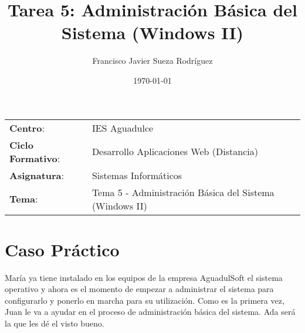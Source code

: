 


\title{
\vspace{10ex}
\normalfont \normalsize
\Huge \textbf{Tarea 5: Administración Básica del Sistema (Windows II)}
}
\author{Francisco Javier Sueza Rodríguez}
\date{\normalsize\today}



\maketitle

\thispagestyle{empty}

\vspace{68ex}

\begin{center}
    \begin{tabular}{l l}
        \textbf{Centro}: & IES Aguadulce \\
        \textbf{Ciclo Formativo}: & Desarrollo Aplicaciones Web (Distancia)\\
        \textbf{Asignatura}: & Sistemas Informáticos\\
        \textbf{Tema}: & Tema 5 -  Administración Básica del Sistema (Windows II)\\
    \end{tabular}
\end{center}

\newpage

\tableofcontents

\newpage

\listoffigures

\newpage

\section{Caso Práctico}

María ya tiene instalado en los equipos de la empresa AguadulSoft el sistema operativo y ahora es el momento de empezar a administrar el sistema para configurarlo y ponerlo en marcha para su utilización. Como es la primera vez, Juan le va a ayudar en el proceso de administración básica del sistema. Ada será la que les dé el visto bueno.

\newpage



